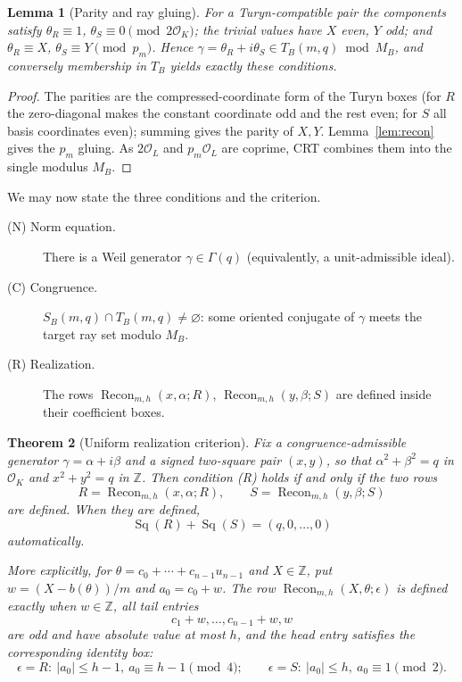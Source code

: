 \documentclass[11pt]{article}
\theoremstyle{plain}
\newtheorem{theorem}{Theorem}[section]
\newtheorem{lemma}[theorem]{Lemma}
\theoremstyle{definition}
\theoremstyle{remark}
\newcommand{\Z}{\mathbb Z}
\newcommand{\OK}{\mathcal O_K}
\newcommand{\OL}{\mathcal O_L}
\newcommand{\Recon}{\operatorname{Recon}}
\newcommand{\Sq}{\operatorname{Sq}}
\begin{document}
\begin{lemma}[Parity and ray gluing]\label{lem:raygluing}
For a Turyn-compatible pair the components satisfy $\theta_R\equiv1$,
$\theta_S\equiv0\pmod{2\OK}$; the trivial values have $X$ even, $Y$ odd; and
$\theta_R\equiv X$, $\theta_S\equiv Y\pmod{p_m}$. Hence $\gamma=\theta_R+i\theta_S
\in T_B(m,q)\bmod M_B$, and conversely membership in $T_B$ yields exactly these
conditions.
\end{lemma}

\begin{proof}
The parities are the compressed-coordinate form of the Turyn boxes (for $R$ the
zero-diagonal makes the constant coordinate odd and the rest even; for $S$ all
basis coordinates even); summing gives the parity of $X,Y$.
Lemma~\ref{lem:recon} gives the $p_m$ gluing. As $2\OL$ and $p_m\OL$ are
coprime, CRT combines them into the single modulus $M_B$.
\end{proof}

We may now state the three conditions and the criterion.
\begin{description}
\item[\normalfont(N) Norm equation.] There is a Weil generator
  $\gamma\in\Gamma(q)$ (equivalently, a unit-admissible ideal).
\item[\normalfont(C) Congruence.] $S_B(m,q)\cap T_B(m,q)\ne\varnothing$: some
  oriented conjugate of $\gamma$ meets the target ray set modulo $M_B$.
\item[\normalfont(R) Realization.] The rows $\Recon_{m,h}(x,\alpha;R)$,
  $\Recon_{m,h}(y,\beta;S)$ are defined inside their coefficient boxes.
\end{description}

\begin{theorem}[Uniform realization criterion]\label{thm:realization}
Fix a congruence-admissible generator $\gamma=\alpha+i\beta$ and a signed
two-square pair $(x,y)$, so that $\alpha^2+\beta^2=q$ in $\OK$ and
$x^2+y^2=q$ in $\Z$. Then condition \emph{(R)} holds if and only if the two
rows
\[
  R=\Recon_{m,h}(x,\alpha;R),\qquad
  S=\Recon_{m,h}(y,\beta;S)
\]
are defined. When they are defined,
\[
  \Sq(R)+\Sq(S)=(q,0,\dots,0)
\]
automatically.

More explicitly, for $\theta=c_0+\cdots+c_{n-1}u_{n-1}$ and
$X\in\Z$, put $w=(X-b(\theta))/m$ and
$a_0=c_0+w$. The row $\Recon_{m,h}(X,\theta;\epsilon)$ is defined exactly when
$w\in\Z$, all tail entries
\[
  c_1+w,\dots,c_{n-1}+w,w
\]
are odd and have absolute value at most $h$, and the head entry satisfies the
corresponding identity box:
\[
  \epsilon=R:\ |a_0|\le h-1,\ a_0\equiv h-1\pmod 4;
  \qquad
  \epsilon=S:\ |a_0|\le h,\ a_0\equiv1\pmod 2.
\]
\end{theorem}
\end{document}
